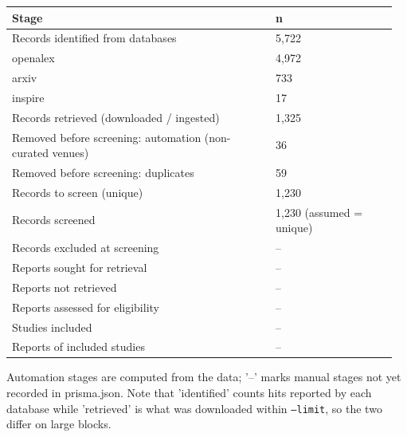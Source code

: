 \documentclass[10pt,a4paper]{article}
\begin{document}
{\scriptsize\begin{longtable}{p{0.655\linewidth}p{0.300\linewidth}}
\hline
\textbf{Stage} & \textbf{n} \\ \hline
\endhead
Records identified from databases & 5,722 \\
  openalex & 4,972 \\
  arxiv & 733 \\
  inspire & 17 \\
Records retrieved (downloaded / ingested) & 1,325 \\
Removed before screening: automation (non-curated venues) & 36 \\
Removed before screening: duplicates & 59 \\
Records to screen (unique) & 1,230 \\
Records screened & 1,230 (assumed = unique) \\
Records excluded at screening & -- \\
Reports sought for retrieval & -- \\
Reports not retrieved & -- \\
Reports assessed for eligibility & -- \\
Studies included & -- \\
Reports of included studies & -- \\
\hline
\end{longtable}}
Automation stages are computed from the data; '--' marks manual stages not yet recorded in prisma.json. Note that 'identified' counts hits reported by each database while 'retrieved' is what was downloaded within \texttt{--limit}, so the two differ on large blocks.
\end{document}
